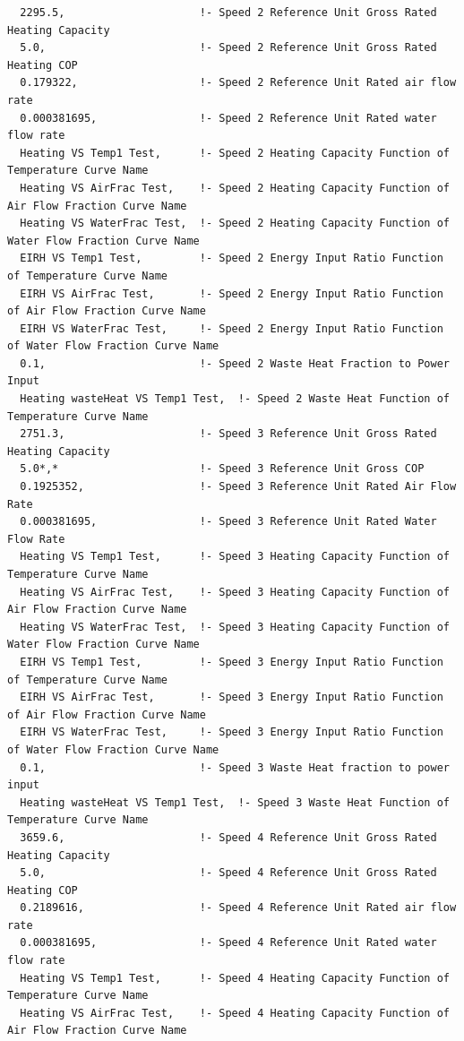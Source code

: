 \begin{lstlisting}
  2295.5,                     !- Speed 2 Reference Unit Gross Rated Heating Capacity
  5.0,                        !- Speed 2 Reference Unit Gross Rated Heating COP
  0.179322,                   !- Speed 2 Reference Unit Rated air flow rate
  0.000381695,                !- Speed 2 Reference Unit Rated water flow rate
  Heating VS Temp1 Test,      !- Speed 2 Heating Capacity Function of Temperature Curve Name
  Heating VS AirFrac Test,    !- Speed 2 Heating Capacity Function of Air Flow Fraction Curve Name
  Heating VS WaterFrac Test,  !- Speed 2 Heating Capacity Function of Water Flow Fraction Curve Name
  EIRH VS Temp1 Test,         !- Speed 2 Energy Input Ratio Function of Temperature Curve Name
  EIRH VS AirFrac Test,       !- Speed 2 Energy Input Ratio Function of Air Flow Fraction Curve Name
  EIRH VS WaterFrac Test,     !- Speed 2 Energy Input Ratio Function of Water Flow Fraction Curve Name
  0.1,                        !- Speed 2 Waste Heat Fraction to Power Input
  Heating wasteHeat VS Temp1 Test,  !- Speed 2 Waste Heat Function of Temperature Curve Name
  2751.3,                     !- Speed 3 Reference Unit Gross Rated Heating Capacity
  5.0*,*                      !- Speed 3 Reference Unit Gross COP
  0.1925352,                  !- Speed 3 Reference Unit Rated Air Flow Rate
  0.000381695,                !- Speed 3 Reference Unit Rated Water Flow Rate
  Heating VS Temp1 Test,      !- Speed 3 Heating Capacity Function of Temperature Curve Name
  Heating VS AirFrac Test,    !- Speed 3 Heating Capacity Function of Air Flow Fraction Curve Name
  Heating VS WaterFrac Test,  !- Speed 3 Heating Capacity Function of Water Flow Fraction Curve Name
  EIRH VS Temp1 Test,         !- Speed 3 Energy Input Ratio Function of Temperature Curve Name
  EIRH VS AirFrac Test,       !- Speed 3 Energy Input Ratio Function of Air Flow Fraction Curve Name
  EIRH VS WaterFrac Test,     !- Speed 3 Energy Input Ratio Function of Water Flow Fraction Curve Name
  0.1,                        !- Speed 3 Waste Heat fraction to power input
  Heating wasteHeat VS Temp1 Test,  !- Speed 3 Waste Heat Function of Temperature Curve Name
  3659.6,                     !- Speed 4 Reference Unit Gross Rated Heating Capacity
  5.0,                        !- Speed 4 Reference Unit Gross Rated Heating COP
  0.2189616,                  !- Speed 4 Reference Unit Rated air flow rate
  0.000381695,                !- Speed 4 Reference Unit Rated water flow rate
  Heating VS Temp1 Test,      !- Speed 4 Heating Capacity Function of Temperature Curve Name
  Heating VS AirFrac Test,    !- Speed 4 Heating Capacity Function of Air Flow Fraction Curve Name

\end{lstlisting}
